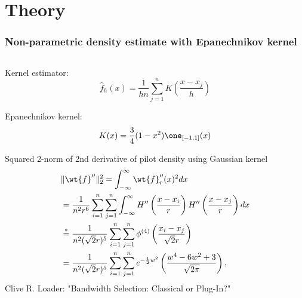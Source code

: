 \section{Theory}
\begin{frame}
	\frametitle{Non-parametric density estimate with Epanechnikov kernel}
	\begin{columns}
		\begin{column}{0.48\textwidth}
			Kernel estimator:
			\begin{equation}
			\label{eq:01}
				\hat{f}_h(x) = \dfrac{1}{hn}\sum_{j=1}^n K\left( \dfrac{x - x_j}{h} \right)
			\end{equation}
			
			Epanechnikov kernel:
			\begin{equation}
			\label{eq:02}
				K(x) = \dfrac{3}{4}(1 - x^2) \one_{[-1, 1]} (x)
			\end{equation}
			
			Squared 2-norm of 2nd derivative of pilot density using Gaussian kernel
			\begin{equation}
			\label{eq:03}
				\begin{aligned}
					&\lVert \wt{f}''\rVert_2^2 = \int_{-\infty}^{\infty} \wt{f}_r''(x)^2dx\\
					&=\dfrac{1}{n^2r^6} \sum_{i=1}^n \sum_{j=1}^n  \int_{-\infty}^{\infty} H''\left( \dfrac{x-x_i}{r} \right) H''\left( \dfrac{x-x_j}{r} \right) dx\\
					&\overset{*}{=}\dfrac{1}{n^2(\sqrt{2} r)^5} \sum_{i=1}^n \sum_{j=1}^n \phi^{(4)} \left( \dfrac{x_i-x_j}{\sqrt{2}r} \right)\\
					&=\dfrac{1}{n^2(\sqrt{2} r)^5} \sum_{i=1}^n \sum_{j=1}^n e^{-\frac{1}{2}w^2} \left( \dfrac{w^4 - 6w^2 + 3}{\sqrt{2\pi}}\right),
				\end{aligned}
			\end{equation}
			{\footnotesize *Clive R. Loader: "Bandwidth Selection: Classical or Plug-In?"}
				

\end{column}
\end{columns}
\end{frame}
